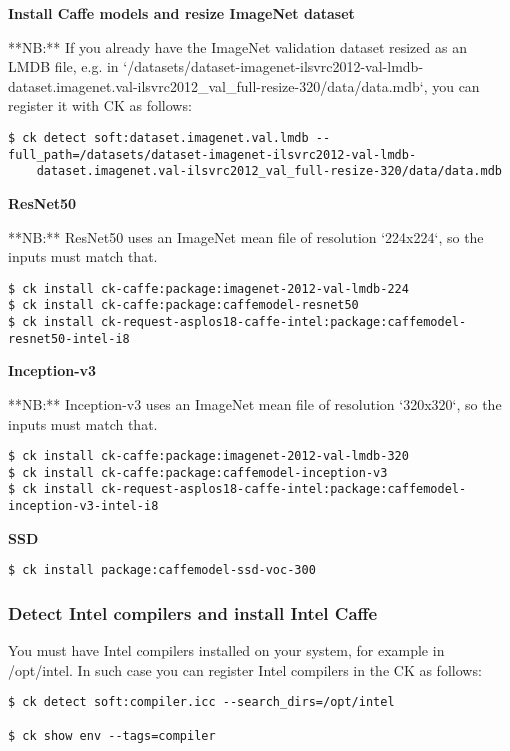 \documentclass[sigplan]{acmart}
\begin{document}
\textbf{Install Caffe models and resize ImageNet dataset}

**NB:** If you already have the ImageNet validation dataset resized as an LMDB file, 
e.g. in `/datasets/dataset-imagenet-ilsvrc2012-val-lmdb-dataset.imagenet.val-ilsvrc2012\_val\_full-resize-320/data/data.mdb`, 
you can register it with CK as follows:

\begin{verbatim}
$ ck detect soft:dataset.imagenet.val.lmdb --full_path=/datasets/dataset-imagenet-ilsvrc2012-val-lmdb-
    dataset.imagenet.val-ilsvrc2012_val_full-resize-320/data/data.mdb
\end{verbatim}

\textbf{ResNet50}

**NB:** ResNet50 uses an ImageNet mean file of resolution `224x224`, so the inputs must match that.

\begin{verbatim}
$ ck install ck-caffe:package:imagenet-2012-val-lmdb-224
$ ck install ck-caffe:package:caffemodel-resnet50
$ ck install ck-request-asplos18-caffe-intel:package:caffemodel-resnet50-intel-i8
\end{verbatim}

\textbf{Inception-v3}

**NB:** Inception-v3 uses an ImageNet mean file of resolution `320x320`, so the inputs must match that.

\begin{verbatim}
$ ck install ck-caffe:package:imagenet-2012-val-lmdb-320
$ ck install ck-caffe:package:caffemodel-inception-v3
$ ck install ck-request-asplos18-caffe-intel:package:caffemodel-inception-v3-intel-i8
\end{verbatim}

\textbf{SSD}

\begin{verbatim}
$ ck install package:caffemodel-ssd-voc-300
\end{verbatim}

\subsubsection{Detect Intel compilers and install Intel Caffe}

You must have Intel compilers installed on your system, for example in /opt/intel.
In such case you can register Intel compilers in the CK as follows:
\begin{verbatim}
$ ck detect soft:compiler.icc --search_dirs=/opt/intel

$ ck show env --tags=compiler
\end{verbatim}
\end{document}
